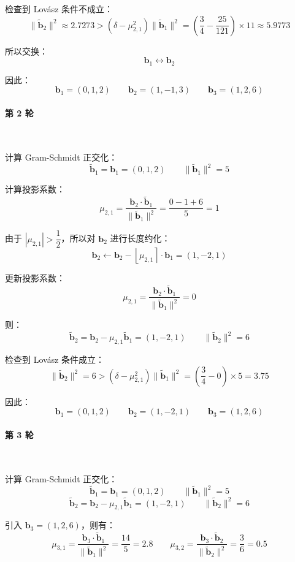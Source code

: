 \documentclass{article}
\begin{document}
检查到 Lov\'asz 条件不成立：
\[ \|\tilde{\bm{b}}_{2}\|^2\approx2.7273>(\delta-\mu_{2,1}^2)\|\tilde{\bm{b}}_{1}\|^2=\left(\dfrac{3}{4}-\dfrac{25}{121}\right)\times11\approx5.9773 \]

所以交换：
\[ \bm{b}_1\leftrightarrow\bm{b}_2 \]

因此：
\[ \bm{b}_1=(0,1,2)\qquad\bm{b}_2=(1,-1,3)\qquad\bm{b}_3=(1,2,6) \]



\paragraph*{第 2 轮}~{}

计算 Gram-Schmidt 正交化：
\[ \tilde{\bm{b}}_1=\bm{b}_1=(0,1,2)\qquad \|\tilde{\bm{b}}_1\|^2=5 \]

计算投影系数：
\[ \mu_{2,1}=\dfrac{\bm{b}_2\cdot\tilde{\bm{b}}_1}{\|\tilde{\bm{b}}_1\|^2}=\dfrac{0-1+6}{5}=1 \]

由于 $|\mu_{2,1}|>\dfrac{1}{2}$，所以对 $\bm{b}_2$ 进行长度约化：
\[ \bm{b}_2\leftarrow\bm{b}_2-\left\lfloor\mu_{2,1}\right\rceil\cdot\bm{b}_1=(1,-2,1) \]

更新投影系数：
\[ \mu_{2,1}=\dfrac{\bm{b}_2\cdot\tilde{\bm{b}}_1}{\|\tilde{\bm{b}}_1\|^2}=0 \]

则：
\[ \tilde{\bm{b}}_2=\bm{b}_2-\mu_{2,1}\tilde{\bm{b}}_1=(1,-2,1)\qquad\|\tilde{\bm{b}}_2\|^2=6 \]

检查到 Lov\'asz 条件成立：
\[ \|\tilde{\bm{b}}_{2}\|^2=6>(\delta-\mu_{2,1}^2)\|\tilde{\bm{b}}_{1}\|^2=\left(\dfrac{3}{4}-0\right)\times5=3.75 \]

因此：
\[ \bm{b}_1=(0,1,2)\qquad\bm{b}_2=(1,-2,1)\qquad\bm{b}_3=(1,2,6) \]



\paragraph*{第 3 轮}~{}

计算 Gram-Schmidt 正交化：
\[ \tilde{\bm{b}}_1=\bm{b}_1=(0,1,2)\qquad \|\tilde{\bm{b}}_1\|^2=5 \]
\[ \tilde{\bm{b}}_2=\bm{b}_2-\mu_{2,1}\tilde{\bm{b}}_1=(1,-2,1)\qquad\|\tilde{\bm{b}}_2\|^2=6 \]

引入 $\bm{b}_3=(1,2,6)$，则有：
\[ \mu_{3,1}=\dfrac{\bm{b}_3\cdot\tilde{\bm{b}}_1}{\|\tilde{\bm{b}}_1\|^2}=\dfrac{14}{5}=2.8\qquad\mu_{3,2}=\dfrac{\bm{b}_3\cdot\tilde{\bm{b}}_2}{\|\tilde{\bm{b}}_2\|^2}=\dfrac{3}{6}=0.5 \]
\end{document}
